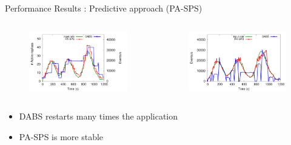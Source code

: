 \begin{frame}{Performance Results : Predictive approach (PA-SPS)}
	\begin{columns}
    \begin{column}{0.55\textwidth}
    	\centering
	    \begin{figure}
		\includegraphics[width=1\textwidth]{images/exp/predictive/TwitterLinear-RW-Replicas.pdf}
		\end{figure}
	\end{column}
    \begin{column}{0.55\textwidth}
    	\centering
    	\begin{figure}
		\includegraphics[width=1\textwidth]{images/exp/predictive/TwitterLinear-RW-Throughput.pdf}
		\end{figure}
	\end{column}
	\end{columns}
	
	\begin{itemize}
		\item DABS restarts many times the application
		\item PA-SPS is more stable
	\end{itemize}
\end{frame}

